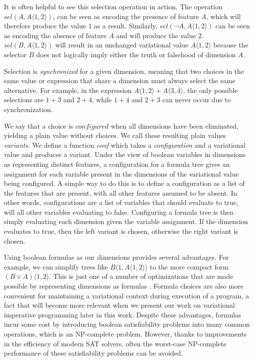 \documentclass[letterpaper,10pt,onecolumn]{article}
\newcommand{\tagtree}[3]{#1 \langle #2, #3 \rangle}
\begin{document}
It is often helpful to see this selection operation in action. The operation
$\mathit{sel}(A,\tagtree{A}{1}{2})$, can be seen as encoding the presence of feature $A$, which
will therefore produce the value $1$ as a result. Similarly, $\mathit{sel}(\neg A,\tagtree{A}{1}{2})$ can be seen as encoding the absence of feature $A$ and will
produce the value $2$. $\mathit{sel}(B,\tagtree{A}{1}{2})$ will result in an unchanged variational
value $\tagtree{A}{1}{2}$ because the selector $B$ does not logically imply either the truth or falsehood
of dimension $A$.

Selection is \emph{synchronized} for a given
dimension, meaning that two choices in the same value or expression that share a dimension must always
select the same alternative. For example, in the expression $\tagtree{A}{1}{2}+\tagtree{A}{3}{4}$,
the only possible selections are $1+3$ and $2+4$, while $1+4$ and $2+3$ can never occur due
to synchronization.

We say that a choice is $configured$ when all dimensions
have been eliminated, yielding a plain value without choices. We call these resulting plain values
\emph{variants}. We define a function \emph{conf} which takes a
\emph{configuration} and a variational value and produces a variant. Under the view of boolean
variables in dimensions as representing distinct features, a configuration for a formula tree gives
an assignment for each variable present in the dimensions of the variational value being configured.
A simple way to do this is to define a configuration as a list of the features that are present, with all
other features assumed to be absent. In other words, configurations are a list of variables that should
evaluate to true, will all other variables evaluating to false. Configuring a formula tree is then simply evaluating
each dimension given the variable assignment. If the dimension evaluates to true, then the left variant
is chosen, otherwise the right variant is chosen.

Using boolean formulas as our dimensions provides several advantages. For example, we can simplify trees like
$\tagtree{B}{1}{\tagtree{A}{1}{2}}$ to the more compact form $\tagtree{(B \vee A)}{1}{2}$. This is just
one of a number of optimizations that are made possible by representing dimensions as formulas
\cite{walkingshaw2014projectional,hubbard2016formula}. Formula choices are also more convenient
for maintaining a variational context during execution of a program, a fact that will become
more relevant when we present our work on variational imperative programming later in
this work. Despite these advantages, formulas incur some cost by introducing boolean
satisfiability problems into many common operations, which is an NP-complete problem. However, thanks to improvements in the
efficiency of modern SAT solvers, often the worst-case NP-complete performance of these satisfiability
problems can be avoided.
\end{document}
